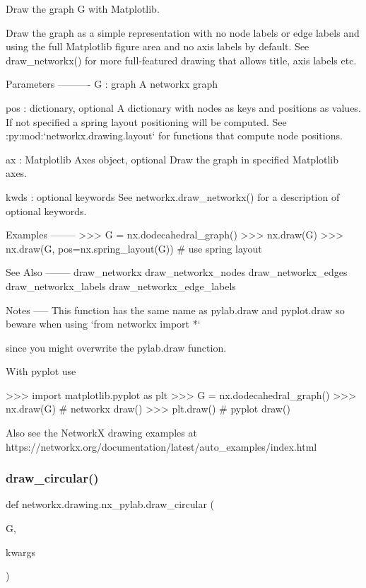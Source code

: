 \begin{DoxyVerb}Draw the graph G with Matplotlib.

Draw the graph as a simple representation with no node
labels or edge labels and using the full Matplotlib figure area
and no axis labels by default.  See draw_networkx() for more
full-featured drawing that allows title, axis labels etc.

Parameters
----------
G : graph
    A networkx graph

pos : dictionary, optional
    A dictionary with nodes as keys and positions as values.
    If not specified a spring layout positioning will be computed.
    See :py:mod:`networkx.drawing.layout` for functions that
    compute node positions.

ax : Matplotlib Axes object, optional
    Draw the graph in specified Matplotlib axes.

kwds : optional keywords
    See networkx.draw_networkx() for a description of optional keywords.

Examples
--------
>>> G = nx.dodecahedral_graph()
>>> nx.draw(G)
>>> nx.draw(G, pos=nx.spring_layout(G))  # use spring layout

See Also
--------
draw_networkx
draw_networkx_nodes
draw_networkx_edges
draw_networkx_labels
draw_networkx_edge_labels

Notes
-----
This function has the same name as pylab.draw and pyplot.draw
so beware when using `from networkx import *`

since you might overwrite the pylab.draw function.

With pyplot use

>>> import matplotlib.pyplot as plt
>>> G = nx.dodecahedral_graph()
>>> nx.draw(G)  # networkx draw()
>>> plt.draw()  # pyplot draw()

Also see the NetworkX drawing examples at
https://networkx.org/documentation/latest/auto_examples/index.html
\end{DoxyVerb}
 \mbox{\label{namespacenetworkx_1_1drawing_1_1nx__pylab_ab89d6773b43206bca9bcee0d05e5e2e8}} 
\subsubsection{\texorpdfstring{draw\+\_\+circular()}{draw\_circular()}}
{\footnotesize\ttfamily def networkx.\+drawing.\+nx\+\_\+pylab.\+draw\+\_\+circular (\begin{DoxyParamCaption}\item[{}]{G,  }\item[{}]{kwargs }\end{DoxyParamCaption})}

